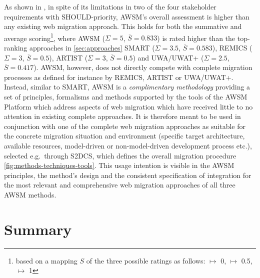 As shown in , in spite of its limitations in two of the four stakeholder requirements with SHOULD-priority, AWSM's overall assessment is higher than any existing web migration approach.
This holds for both the summative and average scoring\footnote{based on a mapping \(S\) of the three possible ratings as follows: \Circle \(\mapsto\) 0, \LEFTcircle \(\mapsto\) 0.5, \CIRCLE \(\mapsto\) 1}, where AWSM (\(\Sigma=5\), \(\overline S=0.833\)) is rated higher than the top-ranking approaches in \cref{sec:approaches} SMART (\(\Sigma=3.5\), \(\overline S=0.583\)), REMICS (\(\Sigma=3\), \(\overline S=0.5\)), ARTIST (\(\Sigma=3\), \(\overline S=0.5\)) and UWA/UWAT+ (\(\Sigma=2.5\), \(\overline S=0.417\)).
AWSM, however, does not directly compete with complete migration processes as defined for instance by REMICS, ARTIST or UWA/UWAT+.
Instead, similar to SMART, AWSM is a \emph{complimentary methodology} providing a set of principles, formalisms and methods supported by the tools of the AWSM Platform which address aspects of web migration which have received little to no attention in existing complete approaches.
It is therefore meant to be used in conjunction with one of the complete web migration approaches as suitable for the concrete migration situation and environment (specific target architecture, available resources, model-driven or non-model-driven development process etc.), selected e.g.~through S2DCS, which defines the overall migration procedure \cref{fig:methods-techniques-tools}.
This usage intention is visible in the AWSM principles, the method's design and the consistent specification of integration for the most relevant and comprehensive web migration approaches of all three AWSM methods.

\hypertarget{summary}{%
\section*{Summary}\label{summary}}
